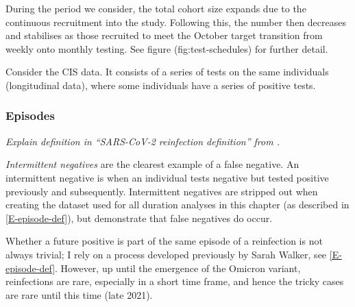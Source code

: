\documentclass[thesis.tex]{subfiles}
\begin{document}
During the period we consider, the total cohort size expands due to the continuous recruitment into the study.
Following this, the number then decreases and stabilises as those recruited to meet the October target transition from weekly onto monthly testing.
See figure \@ref(fig:test-schedules) for further detail.


Consider the CIS data.
It consists of a series of tests on the same individuals (longitudinal data), where some individuals have a series of positive tests.

\subsubsection{Episodes}

\emph{Explain definition in ``SARS-CoV-2 reinfection definition'' from \textcite{weiRisk}.}

\emph{Intermittent negatives} are the clearest example of a false negative.
An intermittent negative is when an individual tests negative but tested positive previously and subsequently.
Intermittent negatives are stripped out when creating the dataset used for all duration analyses in this chapter (as described in \cref{E-episode-def}), but demonstrate that false negatives do occur.

Whether a future positive is part of the same episode of a reinfection is not always trivial; I rely on a process developed previously by Sarah Walker, see \cref{E-episode-def}.
However, up until the emergence of the Omicron variant, reinfections are rare, especially in a short time frame, and hence the tricky cases are rare until this time (late 2021).


\ifSubfilesClassLoaded{
  \listoftodos
}{}
\end{document}

